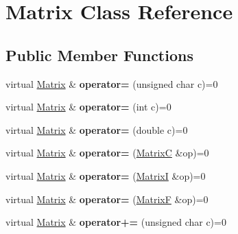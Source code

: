 \hypertarget{class_matrix}{\section{Matrix Class Reference}
\label{class_matrix}
}
\subsection*{Public Member Functions}
\begin{DoxyCompactItemize}
\item 
\hypertarget{class_matrix_a7347480a74d6cfbd2fdc72d9f53a9678}{virtual \hyperlink{class_matrix}{Matrix} \& {\bfseries operator=} (unsigned char c)=0}\label{class_matrix_a7347480a74d6cfbd2fdc72d9f53a9678}

\item 
\hypertarget{class_matrix_af52d9413edc8487a9083d04f6bb1693d}{virtual \hyperlink{class_matrix}{Matrix} \& {\bfseries operator=} (int c)=0}\label{class_matrix_af52d9413edc8487a9083d04f6bb1693d}

\item 
\hypertarget{class_matrix_a3856fcf77a64a55ae63557ce420b8f4a}{virtual \hyperlink{class_matrix}{Matrix} \& {\bfseries operator=} (double c)=0}\label{class_matrix_a3856fcf77a64a55ae63557ce420b8f4a}

\item 
\hypertarget{class_matrix_a1d57718c6b8ecea44ab635bf3539a781}{virtual \hyperlink{class_matrix}{Matrix} \& {\bfseries operator=} (\hyperlink{class_matrix_c}{Matrix\+C} \&op)=0}\label{class_matrix_a1d57718c6b8ecea44ab635bf3539a781}

\item 
\hypertarget{class_matrix_ae6d981f192bfcf2ed1a0a9d5e650f2fe}{virtual \hyperlink{class_matrix}{Matrix} \& {\bfseries operator=} (\hyperlink{class_matrix_i}{Matrix\+I} \&op)=0}\label{class_matrix_ae6d981f192bfcf2ed1a0a9d5e650f2fe}

\item 
\hypertarget{class_matrix_ac6a72edc92a2f55b719c2511e578130e}{virtual \hyperlink{class_matrix}{Matrix} \& {\bfseries operator=} (\hyperlink{class_matrix_f}{Matrix\+F} \&op)=0}\label{class_matrix_ac6a72edc92a2f55b719c2511e578130e}

\item 
\hypertarget{class_matrix_a05fbee0f08fecf2285617cd7f1669780}{virtual \hyperlink{class_matrix}{Matrix} \& {\bfseries operator+=} (unsigned char c)=0}\label{class_matrix_a05fbee0f08fecf2285617cd7f1669780}


\end{DoxyCompactItemize}
